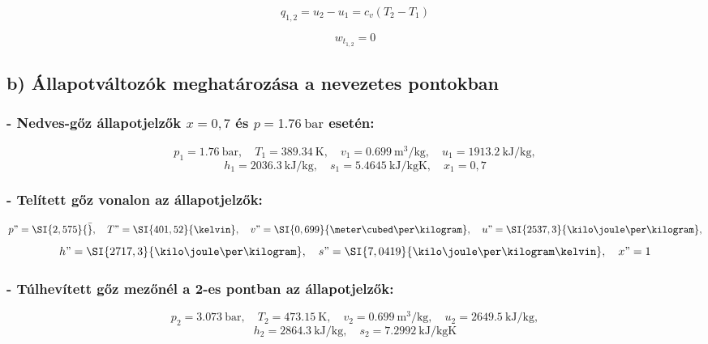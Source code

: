 \begin{equation}
	q_{1,2}=u_2-u_1=c_v(T_2-T_1)
\end{equation}

\begin{equation}
	w_{t_{1,2}}=0	
\end{equation}

\subsection*{b) Állapotváltozók meghatározása a nevezetes pontokban}
\subsubsection{- Nedves-gőz állapotjelzők $x = 0,7$ és $p = \SI{1,76}{\bar}$ esetén:}
\begin{equation}
	p_1=\SI{1,76}{\bar},
	\quad
	T_1=\SI{389,34}{\kelvin},
	\quad
	v_1=\SI{0,699}{\meter\cubed\per\kilogram},
	\quad
	u_1=\SI{1913,2}{\kilo\joule\per\kilogram},
\end{equation}
\begin{equation}
	h_1=\SI{2036,3}{\kilo\joule\per\kilogram},
	\quad
	s_1=\SI{5,4645}{\kilo\joule\per\kilogram\kelvin},
	\quad
	x_1=0,7
\end{equation}

\subsubsection{- Telített gőz vonalon az állapotjelzők:}
\begin{equation}
	p"=\SI{2,575}{\bar},
	\quad
	T"=\SI{401,52}{\kelvin},
	\quad
	v"=\SI{0,699}{\meter\cubed\per\kilogram},
	\quad
	u"=\SI{2537,3}{\kilo\joule\per\kilogram},
\end{equation}
\begin{equation}
	h"=\SI{2717,3}{\kilo\joule\per\kilogram},
	\quad
	s"=\SI{7,0419}{\kilo\joule\per\kilogram\kelvin},
	\quad
	x"=1
\end{equation}

\subsubsection{- Túlhevített gőz mezőnél a 2-es pontban az állapotjelzők:}
\begin{equation}
	p_2=\SI{3,073}{\bar},
	\quad
	T_2=\SI{473,15}{\kelvin},
	\quad
	v_2=\SI{0,699}{\meter\cubed\per\kilogram},
	\quad
	u_2=\SI{2649,5}{\kilo\joule\per\kilogram},
\end{equation}
\begin{equation}
	h_2=\SI{2864,3}{\kilo\joule\per\kilogram},
	\quad
	s_2=\SI{7,2992}{\kilo\joule\per\kilogram\kelvin}
\end{equation}

